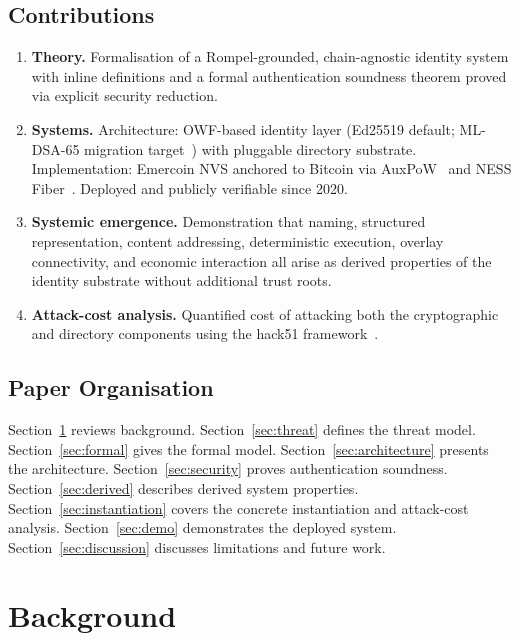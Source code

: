 \documentclass[11pt,a4paper]{article}
\begin{document}
\subsection{Contributions}

\begin{enumerate}[label=\textbf{C\arabic*.},leftmargin=*]
  \item \textbf{Theory.}  Formalisation of a Rompel-grounded, chain-agnostic
    identity system with inline definitions and a formal authentication
    soundness theorem proved via explicit security reduction.

  \item \textbf{Systems.}  Architecture: OWF-based identity layer (Ed25519
    default; ML-DSA-65 migration target~\cite{fips204}) with pluggable
    directory substrate.  Implementation: Emercoin NVS anchored to Bitcoin
    via AuxPoW~\cite{emercoin} and NESS Fiber~\cite{onchain}.  Deployed and
    publicly verifiable since 2020.

  \item \textbf{Systemic emergence.}  Demonstration that naming, structured
    representation, content addressing, deterministic execution, overlay
    connectivity, and economic interaction all arise as derived properties of
    the identity substrate without additional trust roots.

  \item \textbf{Attack-cost analysis.}  Quantified cost of attacking both the
    cryptographic and directory components using the hack51
    framework~\cite{hack51}.
\end{enumerate}

\subsection{Paper Organisation}

Section~\ref{sec:background} reviews background.  Section~\ref{sec:threat} defines the threat model.
Section~\ref{sec:formal} gives the formal model.  Section~\ref{sec:architecture} presents the architecture.
Section~\ref{sec:security} proves authentication soundness.  Section~\ref{sec:derived} describes derived
system properties.  Section~\ref{sec:instantiation} covers the concrete instantiation and
attack-cost analysis.  Section~\ref{sec:demo} demonstrates the deployed system.
Section~\ref{sec:discussion} discusses limitations and future work.

\section{Background}
\label{sec:background}
\end{document}
